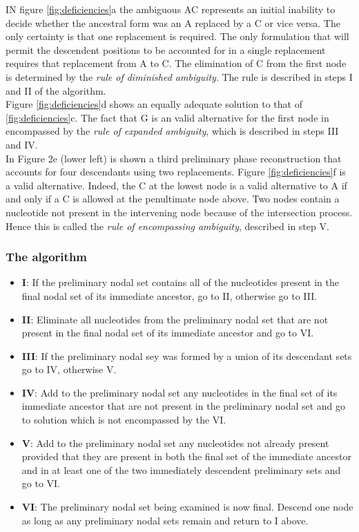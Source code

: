IN figure \ref{fig:deficiencies}a the ambiguous AC represents an initial inability to decide whether the ancestral form was an A replaced by a C or vice versa. The only certainty is that one replacement is required. The only formulation that will permit the descendent positions to be accounted for in a single replacement requires that replacement from A to C. The elimination of C from the first node is determined by the \textit{rule of diminished ambiguity}. The rule is described in steps I and II of the algorithm.
\\
Figure \ref{fig:deficiencies}d shows an equally adequate solution to that of \ref{fig:deficiencies}c. The fact that G is an valid alternative for the first node in encompassed by the \textit{rule of expanded ambiguity}, which is described in steps III and IV.
\\
In Figure 2e (lower left) is shown a third preliminary phase reconstruction that accounts for four descendants using two replacements. Figure \ref{fig:deficiencies}f is a valid alternative. Indeed, the C at the lowest node is a valid alternative to A if and only if a C is allowed at the penultimate node above. Two nodes contain a nucleotide not present in the intervening node because of the intersection process. Hence this is called the \textit{rule of encompassing ambiguity}, described in step V.

\subsubsection{The algorithm}
\begin{itemize}
\item \textbf{I}: If the preliminary nodal set contains all of the nucleotides present in the final nodal set of its immediate ancestor, go to II, otherwise go to III.
\item \textbf{II}: Eliminate all nucleotides from the preliminary nodal set that are not present in the final nodal set of its immediate ancestor and go to VI.
\item  \textbf{III}: If the preliminary nodal sey was formed by a union of its descendant sets go to IV, otherwise V.
\item \textbf{IV}: Add to the preliminary nodal set any nucleotides in the final set of its immediate ancestor that are not present in the preliminary nodal set and go to solution which is not encompassed by the VI.
\item \textbf{V}: Add to the preliminary nodal set any nucleotides not already present provided that they are present in both the final set of the immediate ancestor and in at least one of the two immediately descendent preliminary sets and go to VI.
\item \textbf{VI}: The preliminary nodal set being examined is now final. Descend one node as long as any preliminary nodal sets remain and return to I above.
\end{itemize}

